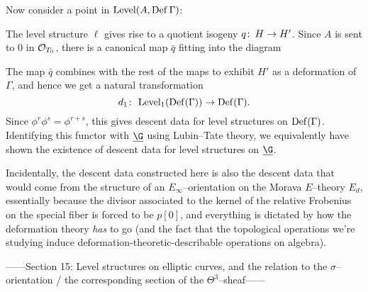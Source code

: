 Now consider a point in $\operatorname{Level}(A, \operatorname{Def} \Gamma)$:
\begin{center}
\end{center}
The level structure $\ell$ gives rise to a quotient isogeny $q\colon\thinspace H \to H'$.  Since $A$ is sent to $0$ in $\mathcal{O}_{T_0}$, there is a canonical map $\bar q$ fitting into the diagram
\begin{center}
\end{center}
The map $\bar q$ combines with the rest of the maps to exhibit $H'$ as a deformation of $\Gamma$, and hence we get a natural transformation \[d_1\colon\thinspace \operatorname{Level}_1(\operatorname{Def}(\Gamma)) \to \operatorname{Def}(\Gamma).\]  Since $\phi^r \phi^s = \phi^{r+s}$, this gives descent data for level structures on $\operatorname{Def}(\Gamma)$.  Identifying this functor with $\underline{\G}$ using Lubin--Tate theory, we equivalently have shown the existence of descent data for level structures on $\underline{\G}$.

Incidentally, the descent data constructed here is also the descent data that would come from the structure of an $E_\infty$--orientation on the Morava $E$--theory $E_d$, essentially because the divisor associated to the kernel of the relative Frobenius on the special fiber is forced to be $p[0]$, and everything is dictated by how the deformation theory \emph{has} to go (and the fact that the topological operations we're studying induce deformation-theoretic-describable operations on algebra).

------Section 15: Level structures on elliptic curves, and the relation to the $\sigma$--orientation / the corresponding section of the $\Theta^3$--sheaf------







